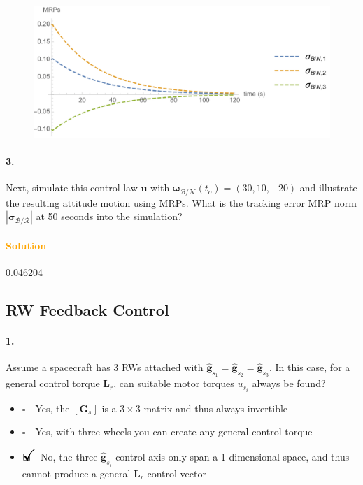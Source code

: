 \documentclass[12pt, a4paper]{article}
\newcommand{\ans}{\item[]$\rlap{\LARGE{\checkmark}}\square\quad$}
\newcommand{\noans}{\item[]$\square\quad$}
\begin{document}
\begin{figure}[ht]
\centering
\includegraphics[scale=0.3]{figs/fig_mrp_response_1.png}
\captionsetup{labelformat=empty}
\label{fig_mrp_response_3}
\end{figure}

\paragraph{3.}
Next, simulate this control law $\bm{u}$ with $\bm{\omega}_{\mathcal{B}/\mathcal{N}}(t_{o}) = (30, 10, -20)$ and illustrate the resulting attitude motion using MRPs. What is the tracking error MRP norm $|\bm{\sigma}_{\mathcal{B}/\mathcal{R}}|$ at 50 seconds into the simulation?
\paragraph{\textcolor{orange}{Solution}}0.046204

\newpage
\subsection{RW Feedback Control}

\paragraph{1.}
Assume a spacecraft has 3 RWs attached with $\hat{\bm{g}}_{s_{1}} = \hat{\bm{g}}_{s_{2}} = \hat{\bm{g}}_{s_{3}}$. In this case, for a general control torque $\bm{L}_{r}$, can suitable motor torques $u_{s_{i}}$ always be found?

\begin{itemize}
\noans Yes, the $[\bm{G}_{s}]$ is a $3\times3$ matrix and thus always invertible
\noans Yes, with three wheels you can create any general control torque
\ans No, the three $\hat{\bm{g}}_{s_{i}}$ control axis only span a 1-dimensional space, and thus cannot produce a general $\bm{L}_{r}$ control vector
\end{itemize}
\end{document}

